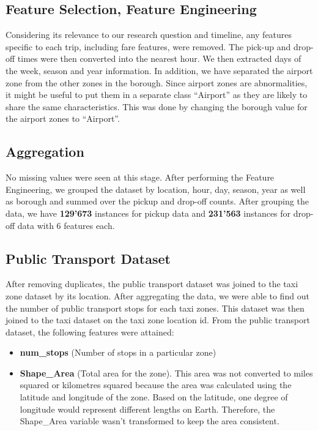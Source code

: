 \documentclass[11pt]{article}
\begin{document}
\subsection{Feature Selection, Feature Engineering}

Considering its relevance to our research question and timeline, any features specific to each trip, including fare features, were removed. The pick-up and drop-off times were then converted into the nearest hour. We then extracted days of the week, season and year information. In addition, we have separated the airport zone from the other zones in the borough. Since airport zones are abnormalities, it might be useful to put them in a separate class ``Airport'' as they are likely to share the same characteristics. This was done by changing the borough value for the airport zones to ``Airport''.

\subsection{Aggregation}

No missing values were seen at this stage. After performing the Feature Engineering, we grouped the dataset by location, hour, day, season, year as well as borough and summed over the pickup and drop-off counts. After grouping the data, we have \textbf{129'673} instances for pickup data and \textbf{231'563} instances for drop-off data with 6 features each. 

\subsection*{Public Transport Dataset}

After removing duplicates, the public transport dataset was joined to the taxi zone dataset by its location. After aggregating the data, we were able to find out the number of public transport stops for each taxi zones. This dataset was then joined to the taxi dataset on the taxi zone location id. From the public transport dataset, the following features were attained: 
\begin{itemize}
    \item \textbf{num\_stops} (Number of stops in a particular zone)
    \item \textbf{Shape\_Area} (Total area for the zone). This area was not converted to miles squared or kilometres squared because the area was calculated using the latitude and longitude of the zone. Based on the latitude, one degree of longitude would represent different lengths on Earth. Therefore, the Shape\_Area variable wasn't transformed to keep the area consistent.
\end{itemize}
\end{document}
